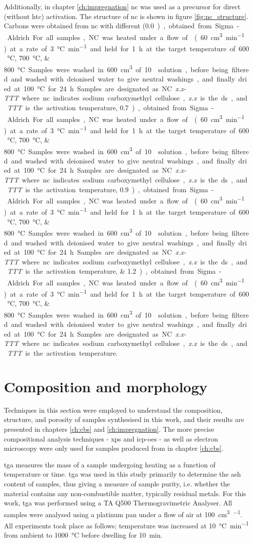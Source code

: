 Additionally, in chapter \ref{ch:impregnation} \acrfull{nc} was used as a precursor for direct (without \gls{htc}) activation. The structure of \acrshort{nc} is shown in figure \ref{fig:nc_structure}. Carbons were obtained from \acrshort{nc} with different  (\qtylist[list-final-separator={ or }, list-units=single]{0.0;0.7;0.9;1.2}), obtained from Sigma-Aldrich. For all samples, NC was heated under a flow of  (\qty{60}{\cm\cubed\per\minute}) at a rate of \qty{3}{\degreeCelsius\per\minute} and held for \qty{1}{\hour} at the target temperature of \qtylist[list-final-separator={ or }, list-units=single]{600;700;800}{\degreeCelsius}. Samples were washed in \qty{600}{\cm\cubed} of \qty{10}{\volpercent}  solution, before being filtered and washed with deionised water to give neutral washings, and finally dried at \qty{100}{\degreeCelsius} for \qty{24}{\hour}. Samples are designated as NC\textit{x.x-TTT} where \acrshort{nc} indicates sodium carboxymethyl cellulose, \textit{x.x} is the \acrshort{ds}, and \textit{TTT} is the activation temperature. 

\section{Composition and morphology}
Techniques in this section were employed to understand the composition, structure, and porosity of samples synthesised in this work, and their results are presented in chapters \ref{ch:cbs} and \ref{ch:impregnation}. The more precise compositional analysis techniques - \acrfull{xps} and \acrfull{icp-oes} - as well as electron microscopy were only used for samples produced from  in chapter \ref{ch:cbs}.

\acrfull{tga} measures the mass of a sample undergoing heating as a function of temperature or time.\citep{coats1963thermogravimetric} \acrshort{tga} was used in this study primarily to determine the \gls{ash content} of samples, thus giving a measure of sample purity,\citep{mcnaught1997compendium} i.e. whether the material contains any non-combustible matter, typically residual metals. For this work, \acrshort{tga} was performed using a TA Q500 Thermogravimetric Analyser. All samples were analysed using a platinum pan under a flow of air at \qty{100}{\cm\cubed\per\min}. All experiments took place as follows; temperature was increased at \qty{10}{\degreeCelsius\per\minute} from ambient to \qty{1000}{\degreeCelsius} before dwelling for \qty{10}{\minute}.

